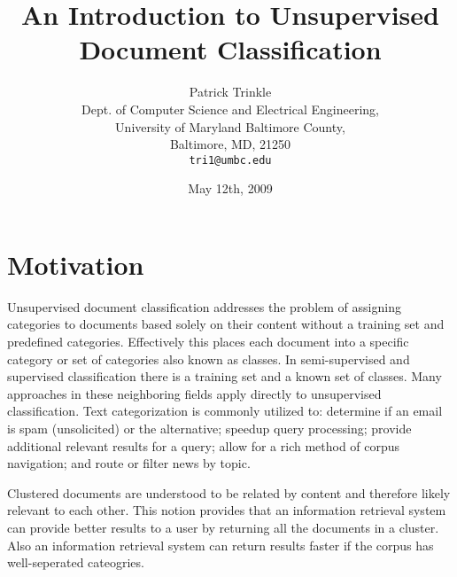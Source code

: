 \documentclass[11pt,twocolumn]{article}
\title{An Introduction to Unsupervised Document Classification}
\author{Patrick Trinkle\\
Dept. of Computer Science and Electrical Engineering,\\
University of Maryland Baltimore County,\\
Baltimore, MD, 21250\\
\texttt{tri1@umbc.edu}}
\date{May 12th, 2009}
\begin{document}

\section{Motivation}
Unsupervised document classification addresses the problem of assigning categories to documents based solely on their content without a training set and predefined categories.  Effectively this places each document into a specific category or set of categories also known as classes.  In semi-supervised and supervised classification there is a training set and a known set of classes.  Many approaches in these neighboring fields apply directly to unsupervised classification.  Text categorization is commonly utilized to: determine if an email is spam (unsolicited) or the alternative; speedup query processing; provide additional relevant results for a query; allow for a rich method of corpus navigation; and route or filter news by topic.

Clustered documents are understood to be related by content and therefore likely relevant to each other.  This notion provides that an information retrieval system can provide better results to a user by returning all the documents in a cluster.  Also an information retrieval system can return results faster if the corpus has well-seperated cateogries.
\end{document}
